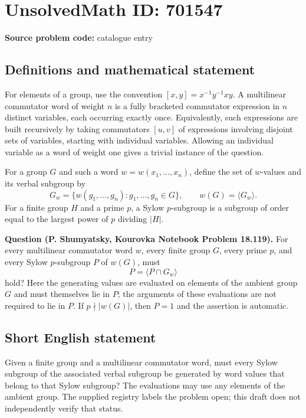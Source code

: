 \documentclass[11pt]{article}
\begin{document}
\section*{UnsolvedMath ID: 701547}
\textbf{Source problem code:} catalogue entry
\subsection{Definitions and mathematical statement}
For elements of a group, use the convention \([x,y]=x^{-1}y^{-1}xy\). A multilinear commutator word of weight \(n\) is a fully bracketed commutator expression in \(n\) distinct variables, each occurring exactly once. Equivalently, such expressions are built recursively by taking commutators \([u,v]\) of expressions involving disjoint sets of variables, starting with individual variables. Allowing an individual variable as a word of weight one gives a trivial instance of the question.

For a group \(G\) and such a word \(w=w(x_1,\ldots,x_n)\), define the set of \(w\)-values and its verbal subgroup by
\[
G_w=\{w(g_1,\ldots,g_n):g_1,\ldots,g_n\in G\},
\qquad
w(G)=\langle G_w\rangle.
\]
For a finite group \(H\) and a prime \(p\), a Sylow \(p\)-subgroup is a subgroup of order equal to the largest power of \(p\) dividing \(|H|\).

\textbf{Question (P. Shumyatsky, Kourovka Notebook Problem 18.119).} For every multilinear commutator word \(w\), every finite group \(G\), every prime \(p\), and every Sylow \(p\)-subgroup \(P\) of \(w(G)\), must
\[
P=\bigl\langle P\cap G_w\bigr\rangle
\]
hold? Here the generating values are evaluated on elements of the ambient group \(G\) and must themselves lie in \(P\); the arguments of these evaluations are not required to lie in \(P\). If \(p\nmid |w(G)|\), then \(P=1\) and the assertion is automatic.
\subsection{Short English statement}
Given a finite group and a multilinear commutator word, must every Sylow subgroup of the associated verbal subgroup be generated by word values that belong to that Sylow subgroup? The evaluations may use any elements of the ambient group. The supplied registry labels the problem open; this draft does not independently verify that status.
\end{document}
